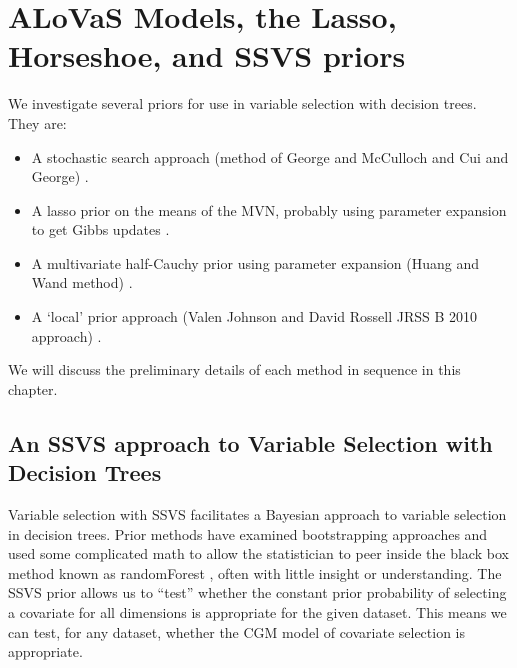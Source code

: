
\section{ALoVaS Models, the Lasso, Horseshoe, and SSVS priors}
\label{ch:proposed_futue_work}

We investigate several priors for use in variable selection with decision trees. They are: 

\begin{itemize}
\item A stochastic search approach (method of George and McCulloch and Cui and George) \cite{cui2008empirical,george1993variable}. 
\item A lasso prior on the means of the MVN,  probably using parameter expansion to get Gibbs updates \cite{park2008bayesian}. 
\item A multivariate half-Cauchy prior using parameter expansion (Huang and Wand method) \cite{huang2013simple,polson2011half,carvalho2010horseshoe,carvalhohandling}. 
\item A `local' prior approach (Valen Johnson and David Rossell JRSS B 2010 approach) \cite{johnson2010use}. 
\end{itemize}

We will discuss the preliminary details of each method in sequence in this chapter. 

\subsection{An SSVS approach to Variable Selection with Decision Trees}

Variable selection with SSVS facilitates a Bayesian approach to variable selection in decision trees. Prior methods have examined bootstrapping approaches and used some complicated math to allow the statistician to peer inside the black box method known as randomForest \cite{ishwaran2010high, ishwaran2007variable}, often with little insight or understanding. The SSVS prior allows us to ``test'' whether the constant prior probability of selecting a covariate for all dimensions is appropriate for the given dataset. This means we can test, for any dataset, whether the CGM model of covariate selection is appropriate.

